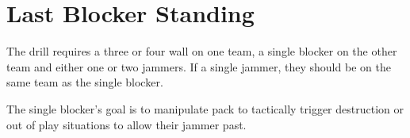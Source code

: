 \section{Last Blocker Standing}
\label{drill:scenario/last_blocker_standing}

The drill requires a three or four wall on one team, a single blocker on the other team and either one or two jammers.
If a single jammer, they should be on the same team as the single blocker.

The single blocker's goal is to manipulate pack to tactically trigger destruction or out of play situations to allow their jammer past.  

